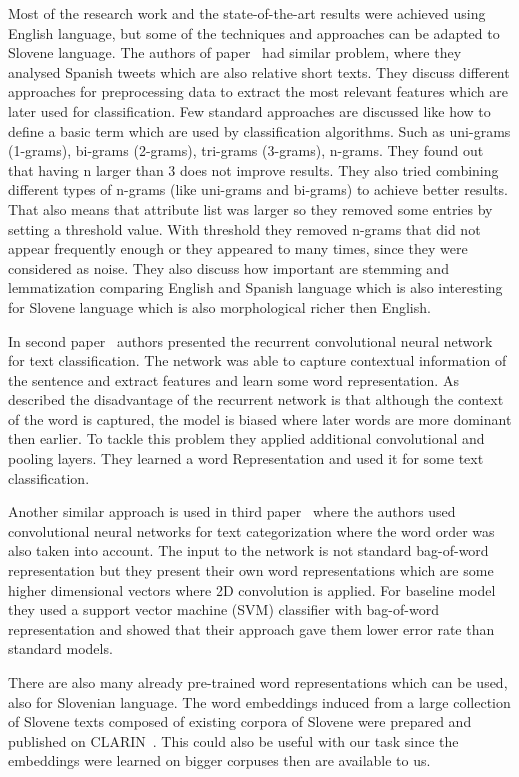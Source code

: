 \documentclass[11pt,a4paper]{article}
\begin{document}
Most of the research work and the state-of-the-art results were achieved using English language, but some of the techniques and approaches can be adapted to Slovene language.
The authors of paper~\cite{articleSpanish} had similar problem, where they analysed Spanish tweets which are also relative short texts.
They discuss different approaches for preprocessing data to extract the most relevant features which are later used for classification.
Few standard approaches are discussed like how to define a basic term which are used by classification algorithms.
Such as uni-grams (1-grams), bi-grams (2-grams), tri-grams (3-grams), n-grams.
They found out that having n larger than 3 does not improve results.
They also tried combining different types of n-grams (like uni-grams and bi-grams) to achieve better results.
That also means that attribute list was larger so they removed some entries by setting a threshold value.
With threshold they removed n-grams that did not appear frequently enough or they appeared to many times, since they were considered as noise.
They also discuss how important are stemming and lemmatization comparing English and Spanish language which is also interesting for Slovene language which is also morphological richer then English.

In second paper~\cite{article2} authors presented the recurrent convolutional neural network for text classification.
The network was able to capture contextual information of the sentence and extract features and learn some word representation.
As described the disadvantage of the recurrent network is that although the context of the word is captured, the model is biased where later words are more dominant then earlier.
To tackle this problem they applied additional convolutional and pooling layers.
They learned a word Representation and used it for some text classification.

Another similar approach is used in third paper~\cite{article3} where the authors used convolutional neural networks for text categorization where the word order was also taken into account.
The input to the network is not standard bag-of-word representation but they present their own word representations which are some higher dimensional vectors where 2D convolution is applied.
For baseline model they used a support vector machine (SVM) classifier with bag-of-word representation and showed that their approach gave them lower error rate than standard models.

There are also many already pre-trained word representations which can be used, also for Slovenian language.
The word embeddings induced from a large collection of Slovene texts composed of existing corpora of Slovene were prepared and published on CLARIN~\cite{embeddings}.
This could also be useful with our task since the embeddings were learned on bigger corpuses then are available to us.
\end{document}
